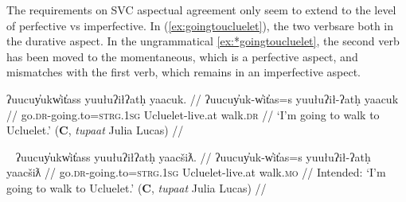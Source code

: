 \begin{comment}
\begin{tikzpicture}[sibling distance=10em,
  every node/.style = {shape=rectangle, align=center}]
\node (aspect) at (0,10) {aspect};
\node (pf) at (1,15) {perfective};
\node (impf) at (1,5) {imperfective};
\node (mo) at (8,15) {momentaneous};
\node (in) at (8,14) {inceptive};
\node (mo-grad-pf) at (8,13) {momentaneous-graduative-perf};
\node (in-grad-pf) at (8,12) {incep-grad-perf};
\node (dr-pf) at (8,11) {durative-perf};
\node (dr-grad-pf) at (8,10) {durative-grad-pf};
\node (rp-pf) at (8,9) {repet-perf};
\node (it-pf) at (8,8) {iter-perf};
\node (ct) at (5,6) {continuative};
\node (dr) at (5,5) {durative};
\node (rp) at (5,4) {repetative};
\node (it) at (5,3) {iterative};
\node (mo-grad) at (5,2) {mo-grad-pf};
\node (in-grad) at (5,1) {in-grad-pf};
\node (dr-grad) at (5,0) {dr-grad-pf};
\draw[->] (aspect) -- (pf);
\draw[->] (aspect) -- (impf);
\draw[->] (pf) -- (mo);
\draw[->] (pf) -- (in);
\draw[->] (pf) -- (mo-grad-pf);
\draw[->] (pf) -- (in-grad-pf);
\draw[->] (pf) -- (dr-pf);
\draw[->] (pf) -- (dr-grad-pf);
\draw[->] (pf) -- (rp-pf);
\draw[->] (pf) -- (it-pf);
\draw[->] (impf) -- (ct);
\draw[->] (impf) -- (dr);
\draw[->] (impf) -- (rp);
\draw[->] (impf) -- (it);
\draw[->] (impf) -- (mo-grad);
\draw[->] (impf) -- (in-grad);
\draw[->] (impf) -- (dr-grad);
\end{tikzpicture}
\end{comment}

\vspace{10pt}

The requirements on SVC aspectual agreement only seem to extend to the level of perfective vs imperfective. In (\ref{ex:goingtoucluelet}), the two verbsare both in the durative aspect. In the ungrammatical \ref{ex:*goingtoucluelet}, the second verb has been moved to the momentaneous, which is a perfective aspect, and mismatches with the first verb, which remains in an imperfective aspect.

\ex \label{ex:goingtoucluelet}
\begingl
\glpreamble ʔuucuy̓ukw̓it̓ass yuułuʔiłʔatḥ yaacuk. //
\gla ʔuucuy̓uk-w̓it̓as=s yuułuʔił-ʔatḥ yaacuk //
\glb go.\textsc{dr}-going.to=\textsc{strg.1sg} Ucluelet-live.at walk.\textsc{dr} //
\glft `I'm going to walk to Ucluelet.' (\textbf{C}, \textit{tupaat} Julia Lucas) //
\endgl
\xe

\ex~ \label{ex:*goingtoucluelet}
\begingl
\glpreamble *ʔuucuy̓ukw̓it̓ass yuułuʔiłʔatḥ yaacšiƛ. //
\gla ʔuucuy̓uk-w̓it̓as=s yuułuʔił-ʔatḥ yaacšiƛ //
\glb go.\textsc{dr}-going.to=\textsc{strg.1sg} Ucluelet-live.at walk.\textsc{mo} //
\glft Intended: `I'm going to walk to Ucluelet.' (\textbf{C}, \textit{tupaat} Julia Lucas) //
\endgl
\xe

